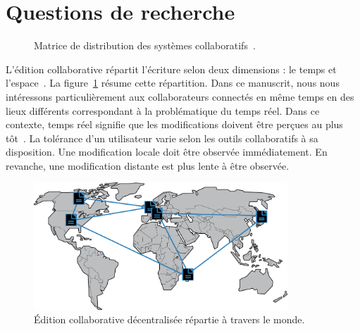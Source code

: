 
\section{Questions de recherche}


\begin{figure}
  \begin{center}
    
    \caption[Matrice de distribution des systèmes collaboratifs] {
      \label{editor:fig:groupware} Matrice de distribution des systèmes
      collaboratifs~\cite{johansen1988groupware}.}
  \end{center}
\end{figure}

L'édition collaborative répartit l'écriture selon deux dimensions : le temps et
l'espace~\cite{desanctis1987foundation, grudin1994computersupported,
  johansen1988groupware}.  La figure~\ref{editor:fig:groupware} résume cette
répartition. Dans ce manuscrit, nous nous intéressons particulièrement aux
collaborateurs connectés en même temps en des lieux différents correspondant à
la problématique du temps réel. Dans ce contexte, \og temps réel \fg signifie
que les modifications doivent être perçues au plus
tôt~\cite{ellis1989concurrency}. La tolérance d'un utilisateur varie selon les
outils collaboratifs à sa disposition. Une modification locale doit être
observée immédiatement. En revanche, une modification distante est plus lente à
être observée.

\begin{figure}
  \begin{center}
    \includegraphics[width=0.85\textwidth]{img/world.png}
    \caption[Édition collaborative décentralisée]{\label{intro:img:world}Édition
      collaborative décentralisée répartie à travers le monde.}
  \end{center}
\end{figure}

